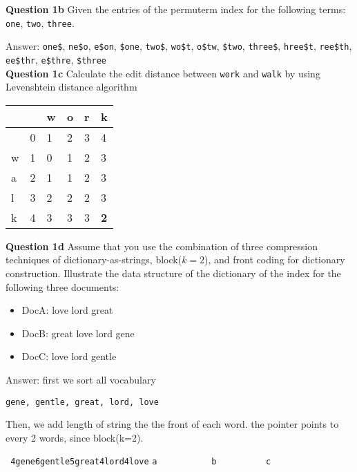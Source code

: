 \documentclass[11pt,a4paper]{report}
\begin{document}
\begin{multicols*}{2}
\noindent \textbf{Question 1b} Given the entries of the permuterm index for the following terms: \verb|one|, \verb|two|, \verb|three|.

\noindent Answer: \verb|one$|, \verb|ne$o|, \verb|e$on|, \verb|$one|, \verb|two$|, \verb|wo$t|, \verb|o$tw|, \verb|$two|, \verb|three$|, \verb|hree$t|, \verb|ree$th|, \verb|ee$thr|, \verb|e$thre|, \verb|$three|\\

\noindent \textbf{Question 1c} Calculate the edit distance between \verb|work| and \verb|walk| by using Levenshtein distance algorithm

\begin{center}
\begin{tabular}{ | l | l  l  l  l  l |} 
    \hline
      &   & w & o & r & k \\
    \hline
      & 0 & 1 & 2 & 3 & 4 \\
    w & 1 & 0 & 1 & 2 & 3 \\
    a & 2 & 1 & 1 & 2 & 3 \\
    l & 3 & 2 & 2 & 2 & 3 \\
    k & 4 & 3 & 3 & 3 & \textbf{2} \\
    \hline
\end{tabular}
\end{center}

\noindent \textbf{Question 1d} Assume that you use the combination of three compression techniques of dictionary-as-strings, block($k=2$), and front coding for dictionary construction. Illustrate the data structure of the dictionary of the index for the following three documents:
\begin{itemize}
    \item DocA: love lord great
    \item DocB: great love lord gene
    \item DocC: love lord gentle
\end{itemize}

\noindent Answer: first we sort all vocabulary

\begin{center}
\verb|gene, gentle, great, lord, love|
\end{center}

\noindent Then, we add length of string the the front of each word. the pointer points to every 2 words, since block(k=2).

\begin{center}

\verb| 4gene6gentle5great4lord4love|
\verb|a           b          c    |
\end{center}


\end{multicols*}
\end{document}
